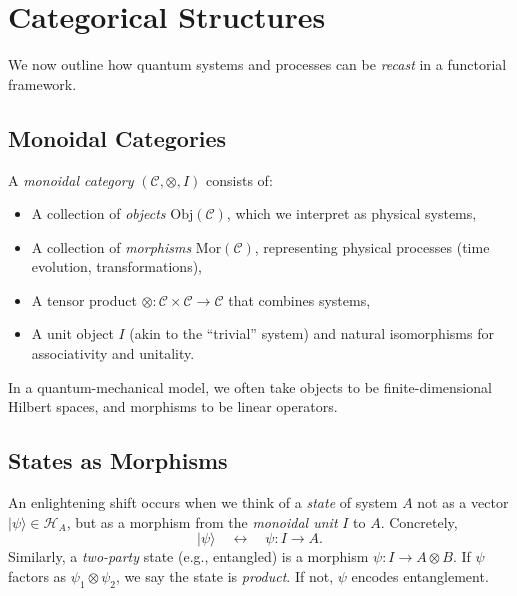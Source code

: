 \documentclass[12pt]{article}
\begin{document}
\vspace{1em}

\section{Categorical Structures}
\label{sec:category}

We now outline how quantum systems and processes can be \emph{recast} in a functorial framework.

\subsection{Monoidal Categories}

A \emph{monoidal category} $(\mathcal{C}, \otimes, I)$ consists of:
\begin{itemize}
    \item A collection of \emph{objects} $\mathrm{Obj}(\mathcal{C})$, which we interpret as physical systems,
    \item A collection of \emph{morphisms} $\mathrm{Mor}(\mathcal{C})$, representing physical processes (time evolution, transformations),
    \item A tensor product $\otimes : \mathcal{C} \times \mathcal{C} \to \mathcal{C}$ that combines systems,
    \item A unit object $I$ (akin to the ``trivial'' system) and natural isomorphisms for associativity and unitality.
\end{itemize}
In a quantum-mechanical model, we often take objects to be finite-dimensional Hilbert spaces, and morphisms to be linear operators.

\subsection{States as Morphisms}
An enlightening shift occurs when we think of a \emph{state} of system $A$ not as a vector $|\psi\rangle \in \mathcal{H}_A$, but as a morphism from the \emph{monoidal unit} $I$ to $A$. Concretely,
\begin{equation}
|\psi\rangle \quad \longleftrightarrow \quad \psi : I \to A.
\end{equation}
Similarly, a \emph{two-party} state (e.g., entangled) is a morphism $\psi : I \to A \otimes B$. If $\psi$ factors as $\psi_1 \otimes \psi_2$, we say the state is \emph{product}. If not, $\psi$ encodes entanglement. 

\vspace{1em}
\end{document}
